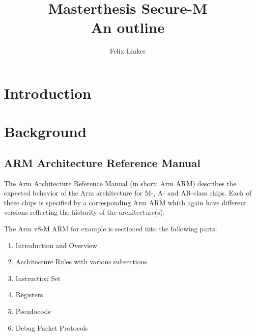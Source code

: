 \documentclass{securem}
\title{Masterthesis Secure-M \\ \large{An outline}}
\author{Felix Linker}
\date{}
\begin{document}
\maketitle

\section{Introduction}

\section{Background}

\subsection{ARM Architecture Reference Manual}

The Arm Architecture Reference Manual (in short: Arm ARM) describes the expected behavior of the Arm architecture for M-, A- and AR-class chips.
Each of these chips is specified by a corresponding Arm ARM which again have different versions reflecting the histority of the architecture(s).

The Arm v8-M ARM for example is sectioned into the following parts:
\begin{enumerate}[label=\Alph*]
    \item \label{itm:arm-intro} Introduction and Overview
    \item \label{itm:arm-rules} Architecture Rules with various subsections
    \item \label{itm:arm-instr} Instruction Set
    \item \label{itm:arm-reg} Registers
    \item \label{itm:arm-pseudo} Pseudocode
    \item \label{itm:arm-prots} Debug Packet Protocols
\end{enumerate}
\end{document}

